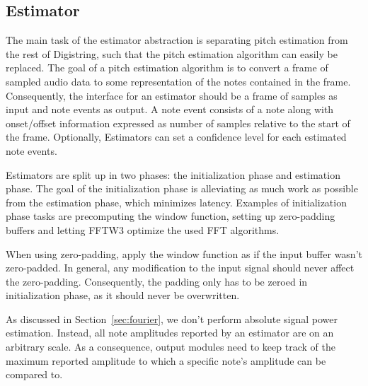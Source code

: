 \documentclass[a4paper,10pt,twocolumn]{article}
\begin{document}
\subsection{Estimator}
%
The main task of the estimator abstraction is separating pitch estimation from the rest of Digistring, such that the pitch estimation algorithm can easily be replaced. The goal of a pitch estimation algorithm is to convert a frame of sampled audio data to some representation of the notes contained in the frame. Consequently, the interface for an estimator should be a frame of samples as input and note events as output. A note event consists of a note along with onset/offset information expressed as number of samples relative to the start of the frame. Optionally, Estimators can set a confidence level for each estimated note events.

Estimators are split up in two phases: the initialization phase and estimation phase. The goal of the initialization phase is alleviating as much work as possible from the estimation phase, which minimizes latency. Examples of initialization phase tasks are precomputing the window function, setting up zero-padding buffers and letting FFTW3 optimize the used FFT algorithms.

When using zero-padding, apply the window function as if the input buffer wasn't zero-padded. In general, any modification to the input signal should never affect the zero-padding. Consequently, the padding only has to be zeroed in initialization phase, as it should never be overwritten.

As discussed in Section~\ref{sec:fourier}, we don't perform absolute signal power estimation. Instead, all note amplitudes reported by an estimator are on an arbitrary scale. As a consequence, output modules need to keep track of the maximum reported amplitude to which a specific note's amplitude can be compared to.

\end{document}
